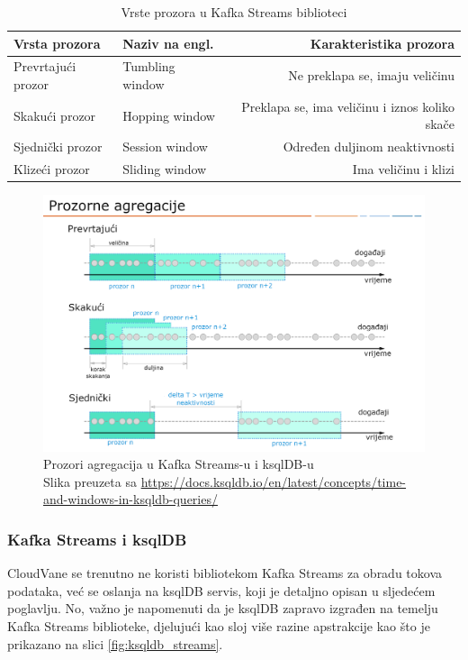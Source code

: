 \documentclass[times, utf8, diplomski]{fer}
\begin{document}
\begin{table}[htb]
\caption{Vrste prozora u Kafka Streams biblioteci}
\label{tbl:windows}
\centering
\begin{tabular}{l|l|r} \toprule
Vrsta prozora & Naziv na engl. & Karakteristika prozora \\ \midrule
Prevrtajući prozor & Tumbling window & Ne preklapa se, imaju veličinu\\
Skakući prozor & Hopping window & Preklapa se, ima veličinu i iznos koliko skače\\
Sjednički prozor & Session window & Određen duljinom neaktivnosti\\
Klizeći prozor & Sliding window & Ima veličinu i klizi \\ \bottomrule
\end{tabular}
\end{table} 

\begin{figure}[htb]
	\centering
	\includegraphics[width=15cm]{images/Windows.png}
	\caption[Prozori agregacija u Kafka Streams-u i ksqlDB-u]{Prozori agregacija u Kafka Streams-u i ksqlDB-u\\Slika preuzeta sa \url{https://docs.ksqldb.io/en/latest/concepts/time-and-windows-in-ksqldb-queries/}}
	\label{fig:windows}
\end{figure}

\subsubsection{Kafka Streams i ksqlDB}

CloudVane se trenutno ne koristi bibliotekom Kafka Streams za obradu tokova podataka, već se oslanja na ksqlDB servis, koji je detaljno opisan u sljedećem poglavlju. No, važno je napomenuti da je ksqlDB zapravo izgrađen na temelju Kafka Streams biblioteke, djelujući kao sloj više razine apstrakcije kao što je prikazano na slici \ref{fig:ksqldb_streams}.
\end{document}
